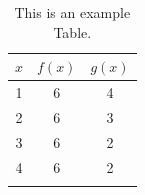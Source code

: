 
\begin{table}
\caption{This is an example Table.}
\begin{center}
\begin{tabular}{ccc}
$x$ & $f(x)$ & $g(x)$ \\
\hline
1 & 6 & 4  \\
2 & 6 & 3  \\
3 & 6 & 2  \\
4 & 6 & 2  \\
\label{tab:ValuesOfFunctions}
\end{tabular}
\end{center}
\end{table}
